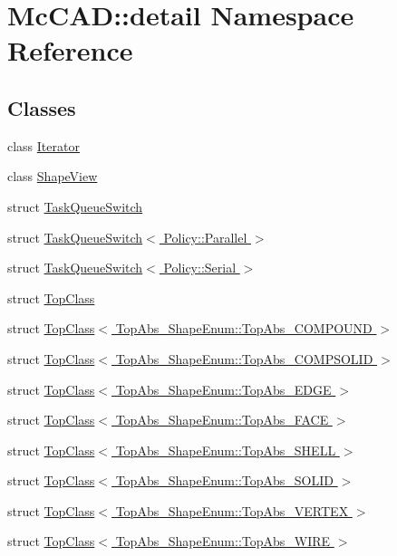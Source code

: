 \hypertarget{namespaceMcCAD_1_1detail}{}\section{Mc\+C\+AD\+:\+:detail Namespace Reference}
\label{namespaceMcCAD_1_1detail}
\subsection*{Classes}
\begin{DoxyCompactItemize}
\item 
class \hyperlink{classMcCAD_1_1detail_1_1Iterator}{Iterator}
\item 
class \hyperlink{classMcCAD_1_1detail_1_1ShapeView}{Shape\+View}
\item 
struct \hyperlink{structMcCAD_1_1detail_1_1TaskQueueSwitch}{Task\+Queue\+Switch}
\item 
struct \hyperlink{structMcCAD_1_1detail_1_1TaskQueueSwitch_3_01Policy_1_1Parallel_01_4}{Task\+Queue\+Switch$<$ Policy\+::\+Parallel $>$}
\item 
struct \hyperlink{structMcCAD_1_1detail_1_1TaskQueueSwitch_3_01Policy_1_1Serial_01_4}{Task\+Queue\+Switch$<$ Policy\+::\+Serial $>$}
\item 
struct \hyperlink{structMcCAD_1_1detail_1_1TopClass}{Top\+Class}
\item 
struct \hyperlink{structMcCAD_1_1detail_1_1TopClass_3_01TopAbs__ShapeEnum_1_1TopAbs__COMPOUND_01_4}{Top\+Class$<$ Top\+Abs\+\_\+\+Shape\+Enum\+::\+Top\+Abs\+\_\+\+C\+O\+M\+P\+O\+U\+N\+D $>$}
\item 
struct \hyperlink{structMcCAD_1_1detail_1_1TopClass_3_01TopAbs__ShapeEnum_1_1TopAbs__COMPSOLID_01_4}{Top\+Class$<$ Top\+Abs\+\_\+\+Shape\+Enum\+::\+Top\+Abs\+\_\+\+C\+O\+M\+P\+S\+O\+L\+I\+D $>$}
\item 
struct \hyperlink{structMcCAD_1_1detail_1_1TopClass_3_01TopAbs__ShapeEnum_1_1TopAbs__EDGE_01_4}{Top\+Class$<$ Top\+Abs\+\_\+\+Shape\+Enum\+::\+Top\+Abs\+\_\+\+E\+D\+G\+E $>$}
\item 
struct \hyperlink{structMcCAD_1_1detail_1_1TopClass_3_01TopAbs__ShapeEnum_1_1TopAbs__FACE_01_4}{Top\+Class$<$ Top\+Abs\+\_\+\+Shape\+Enum\+::\+Top\+Abs\+\_\+\+F\+A\+C\+E $>$}
\item 
struct \hyperlink{structMcCAD_1_1detail_1_1TopClass_3_01TopAbs__ShapeEnum_1_1TopAbs__SHELL_01_4}{Top\+Class$<$ Top\+Abs\+\_\+\+Shape\+Enum\+::\+Top\+Abs\+\_\+\+S\+H\+E\+L\+L $>$}
\item 
struct \hyperlink{structMcCAD_1_1detail_1_1TopClass_3_01TopAbs__ShapeEnum_1_1TopAbs__SOLID_01_4}{Top\+Class$<$ Top\+Abs\+\_\+\+Shape\+Enum\+::\+Top\+Abs\+\_\+\+S\+O\+L\+I\+D $>$}
\item 
struct \hyperlink{structMcCAD_1_1detail_1_1TopClass_3_01TopAbs__ShapeEnum_1_1TopAbs__VERTEX_01_4}{Top\+Class$<$ Top\+Abs\+\_\+\+Shape\+Enum\+::\+Top\+Abs\+\_\+\+V\+E\+R\+T\+E\+X $>$}
\item 
struct \hyperlink{structMcCAD_1_1detail_1_1TopClass_3_01TopAbs__ShapeEnum_1_1TopAbs__WIRE_01_4}{Top\+Class$<$ Top\+Abs\+\_\+\+Shape\+Enum\+::\+Top\+Abs\+\_\+\+W\+I\+R\+E $>$}
\end{DoxyCompactItemize}
